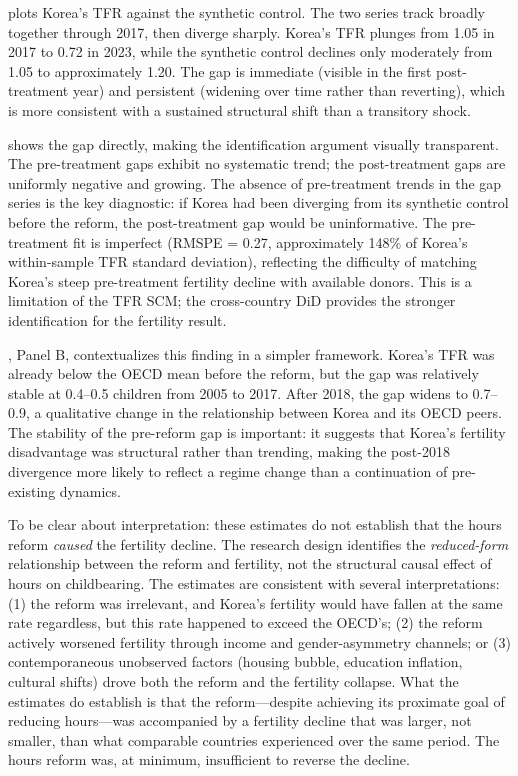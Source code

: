\documentclass[12pt]{article}
\begin{document}
 plots Korea's TFR against the synthetic control. The two series track broadly together through 2017, then diverge sharply. Korea's TFR plunges from 1.05 in 2017 to 0.72 in 2023, while the synthetic control declines only moderately from 1.05 to approximately 1.20. The gap is immediate (visible in the first post-treatment year) and persistent (widening over time rather than reverting), which is more consistent with a sustained structural shift than a transitory shock.

 shows the gap directly, making the identification argument visually transparent. The pre-treatment gaps exhibit no systematic trend; the post-treatment gaps are uniformly negative and growing. The absence of pre-treatment trends in the gap series is the key diagnostic: if Korea had been diverging from its synthetic control before the reform, the post-treatment gap would be uninformative. The pre-treatment fit is imperfect (RMSPE = 0.27, approximately 148\% of Korea's within-sample TFR standard deviation), reflecting the difficulty of matching Korea's steep pre-treatment fertility decline with available donors. This is a limitation of the TFR SCM; the cross-country DiD provides the stronger identification for the fertility result.

, Panel B, contextualizes this finding in a simpler framework. Korea's TFR was already below the OECD mean before the reform, but the gap was relatively stable at 0.4--0.5 children from 2005 to 2017. After 2018, the gap widens to 0.7--0.9, a qualitative change in the relationship between Korea and its OECD peers. The stability of the pre-reform gap is important: it suggests that Korea's fertility disadvantage was structural rather than trending, making the post-2018 divergence more likely to reflect a regime change than a continuation of pre-existing dynamics.

To be clear about interpretation: these estimates do not establish that the hours reform \textit{caused} the fertility decline. The research design identifies the \textit{reduced-form} relationship between the reform and fertility, not the structural causal effect of hours on childbearing. The estimates are consistent with several interpretations: (1) the reform was irrelevant, and Korea's fertility would have fallen at the same rate regardless, but this rate happened to exceed the OECD's; (2) the reform actively worsened fertility through income and gender-asymmetry channels; or (3) contemporaneous unobserved factors (housing bubble, education inflation, cultural shifts) drove both the reform and the fertility collapse. What the estimates do establish is that the reform---despite achieving its proximate goal of reducing hours---was accompanied by a fertility decline that was larger, not smaller, than what comparable countries experienced over the same period. The hours reform was, at minimum, insufficient to reverse the decline.
\end{document}
